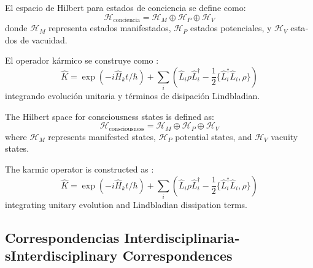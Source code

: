 \documentclass[12pt,a4paper]{article}
\newcommand{\es}[1]{\foreignlanguage{spanish}{#1}}
\newcommand{\en}[1]{\foreignlanguage{english}{#1}}
\begin{document}
\begin{otherlanguage}{spanish}
El espacio de Hilbert para estados de conciencia se define como:
\begin{equation}
\mathcal{H}_{\text{conciencia}} = \mathcal{H}_M \oplus \mathcal{H}_P \oplus \mathcal{H}_V
\end{equation}
donde $\mathcal{H}_M$ representa estados manifestados, $\mathcal{H}_P$ estados potenciales, y $\mathcal{H}_V$ estados de vacuidad.

El operador kármico se construye como \cite{zurek2003}:
\begin{equation}
\hat{K} = \exp\left(-i\hat{H}_k t/\hbar\right) + \sum_i \left(\hat{L}_i \rho \hat{L}_i^\dagger - \frac{1}{2}\{\hat{L}_i^\dagger \hat{L}_i, \rho\}\right)
\end{equation}
integrando evolución unitaria y términos de disipación Lindbladian.
\end{otherlanguage}

\begin{otherlanguage}{english}
The Hilbert space for consciousness states is defined as:
\begin{equation}
\mathcal{H}_{\text{consciousness}} = \mathcal{H}_M \oplus \mathcal{H}_P \oplus \mathcal{H}_V
\end{equation}
where $\mathcal{H}_M$ represents manifested states, $\mathcal{H}_P$ potential states, and $\mathcal{H}_V$ vacuity states.

The karmic operator is constructed as \cite{zurek2003}:
\begin{equation}
\hat{K} = \exp\left(-i\hat{H}_k t/\hbar\right) + \sum_i \left(\hat{L}_i \rho \hat{L}_i^\dagger - \frac{1}{2}\{\hat{L}_i^\dagger \hat{L}_i, \rho\}\right)
\end{equation}
integrating unitary evolution and Lindbladian dissipation terms.
\end{otherlanguage}

\subsection{\es{Correspondencias Interdisciplinarias}\en{Interdisciplinary Correspondences}}
\end{document}
